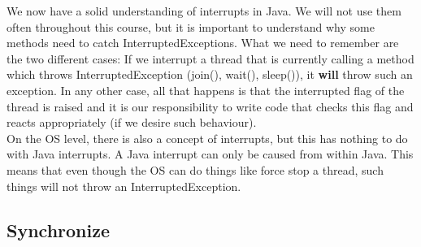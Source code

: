 \documentclass[main.tex]{subfiles}
\begin{document}
We now have a solid understanding of interrupts in Java. We will not use them often throughout this course, but it is important to understand why some methods need to catch InterruptedExceptions. What we need to remember are the two different cases: If we interrupt a thread that is currently calling a method which throws InterruptedException (join(), wait(), sleep()), it \textbf{will} throw such an exception. In any other case, all that happens is that the interrupted flag of the thread is raised and it is our responsibility to write code that checks this flag and reacts appropriately (if we desire such behaviour).\\[3mm]
On the OS level, there is also a concept of interrupts, but this has nothing to do with Java interrupts. A Java interrupt can only be caused from within Java. This means that even though the OS can do things like force stop a thread, such things will not throw an InterruptedException.

\subsection{Synchronize}
\end{document}
